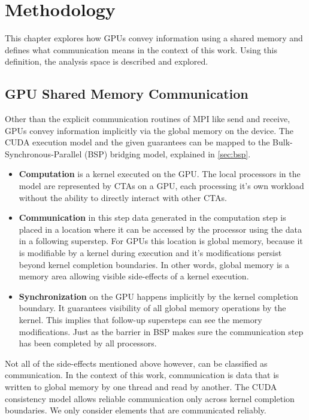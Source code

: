 \chapter{Methodology}\label{methodik}
This chapter explores how GPUs convey information using a shared memory and defines what communication means in the context of this work. Using this definition, the analysis space is described and explored.
\section{GPU Shared Memory Communication}
Other than the explicit communication routines of MPI like send and receive, GPUs convey information implicitly via the global memory on the device. 
The CUDA execution model and the given guarantees can be mapped to the Bulk-Synchronous-Parallel (BSP) bridging model, explained in \ref{sec:bsp}.
\begin{itemize}
	\item \textbf{Computation} is a kernel executed on the GPU. The local processors in the model are represented by CTAs on a GPU, each processing it's own workload without the ability to directly
	interact with other CTAs.
	\item \textbf{Communication} in this step data generated in the computation step is placed in a location where it can be accessed by the processor using the data in a following superstep. For GPUs this location is 
	global memory, because it is modifiable by a kernel during execution and it's modifications persist beyond kernel completion boundaries. In other words, global memory is a memory area allowing visible side-effects
	of a kernel execution.
	\item \textbf{Synchronization} on the GPU happens implicitly by the kernel completion boundary. It guarantees visibility of all global memory operations by the kernel. This implies that follow-up supersteps can see the memory modifications. Just as the barrier in BSP makes sure the communication step
	has been completed by all processors.
	
\end{itemize} 
 Not all of the side-effects mentioned above however, can be classified as communication. In the context of this work, communication is data that is written to global memory by one thread and read by another. The CUDA consistency model allows reliable communication only across kernel completion boundaries. We only consider elements that are communicated reliably.

